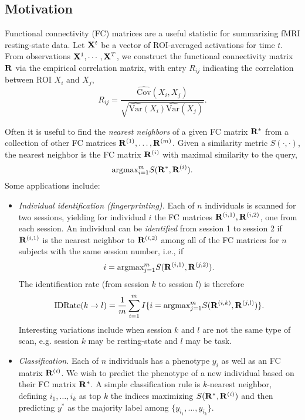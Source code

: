 \documentclass[12pt]{article}
\begin{document}
\maketitle

\newcommand{\tr}{\text{tr}}
\newcommand{\E}{\textbf{E}}
\newcommand{\diag}{\text{diag}}
\newcommand{\argmax}{\text{argmax}}
\newcommand{\Cov}{\text{Cov}}
\newcommand{\Var}{\text{Var}}
\newcommand{\argmin}{\text{argmin}}
\newcommand{\Vol}{\text{Vol}}
\newcommand{\comm}[1]{}

\subsection{Motivation}

Functional connectivity (FC) matrices are a useful statistic for summarizing fMRI resting-state data.
Let ${\bf X}^t$ be a vector of ROI-averaged activations for time $t$.
From observations ${\bf X}^1,\cdots, {\bf X}^T$, we construct the functional connectivity matrix ${\bf R}$ via the empirical correlation matrix, with entry $R_{ij}$ indicating the correlation between ROI $X_i$ and $X_j$,
\[
R_{ij} = \frac{\hat{\text{Cov}}(X_i, X_j)}{\sqrt{\hat{\text{Var}}(X_i)\hat{\text{Var}}(X_j)}}.
\]

Often it is useful to find the \emph{nearest neighbors} of a given FC matrix ${\bf R}^*$ from a collection of other FC matrices ${\bf R}^{(1)},\hdots, {\bf R}^{(m)}$.  
Given a similarity metric $S(\cdot,\cdot)$, the nearest neighbor is the FC matrix ${\bf R}^{(i)}$ with maximal similarity to the query,
\[
\text{argmax}_{i=1}^m S({\bf R}^*, {\bf R}^{(i)}).
\]
Some applications include:
\begin{itemize}
\item \emph{Individual identification (fingerprinting).}  Each of $n$ individuals is scanned for two sessions, yielding for individual $i$ the FC matrices ${\bf R}^{(i, 1)}, {\bf R}^{(i, 2)}$, one from each session.  An individual can be \emph{identified} from session 1 to session 2 if ${\bf R}^{(i,1)}$ is the nearest neighbor to ${\bf R}^{(i,2)}$ among all of the FC matrices for $n$ subjects with the same session number, i.e., if
\[
i = \text{argmax}_{j=1}^m S({\bf R}^{(i,1)}, {\bf R}^{(j, 2)}).
\]
The identification rate (from session $k$ to session $l$) is therefore
\[
\text{IDRate}(k \to l) = \frac{1}{m}\sum_{i=1}^m I\{i = \text{argmax}_{j=1}^m S({\bf R}^{(i,k)}, {\bf R}^{(j, l)})\}.
\]
Interesting variations include when session $k$ and $l$ are not the same type of scan, e.g. session $k$ may be resting-state and $l$ may be task.
\item \emph{Classification.} Each of $n$ individuals has a phenotype $y_i$ as well as an FC matrix ${\bf R}^{(i)}$.  We wish to predict the phenotype of a new individual based on their FC matrix ${\bf R}^{*}$.  A simple classification rule is $k$-nearest neighbor, defining $i_1,\hdots, i_k$ as top $k$ the indices maximizing $S({\bf R}^*, {\bf R}^{(i)})$ and then predicting $y^*$ as the majority label among $\{y_{i_1},\hdots, y_{i_k}\}$.
\end{itemize}
\end{document}
